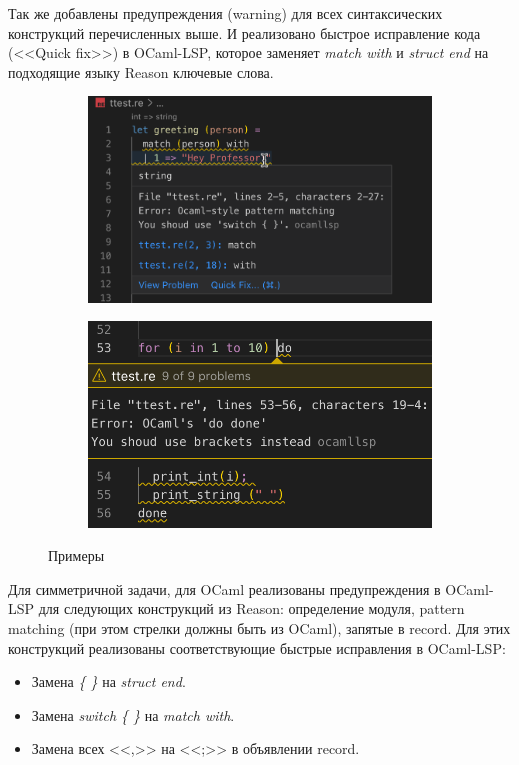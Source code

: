 Так же добавлены предупреждения (warning) для всех синтаксических конструкций перечисленных выше. И реализовано быстрое исправление кода (<<Quick fix>>) в OCaml-LSP, которое заменяет {\it match with} и {\it struct end} на подходящие языку Reason ключевые слова.
\begin{figure}[h]
\begin{subfigure}{0.5\textwidth}
	\includegraphics[width=\linewidth]{screenshots/05.png}
\end{subfigure}
\begin{subfigure}{0.5\textwidth}
	\includegraphics[width=\linewidth]{screenshots/06.png}
\end{subfigure}
\caption{Примеры}
\end{figure}

\newpage
Для симметричной задачи, для OCaml реализованы предупреждения в OCaml-LSP для следующих конструкций из Reason: определение модуля, pattern matching (при этом стрелки должны быть из OCaml), запятые в record. Для этих конструкций реализованы соответствующие быстрые исправления в OCaml-LSP:
\begin{itemize}

\item Замена {\it \{ \}} на {\it struct end}.

\item Замена {\it switch \{ \}} на {\it match with}.

\item Замена всех <<,>> на <<;>> в объявлении record.

\end{itemize}

